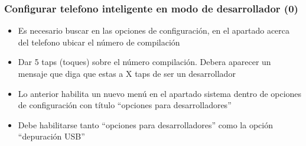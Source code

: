 

\begin{frame}
\frametitle{Configurar telefono inteligente en modo de desarrollador (0)}  
\begin{itemize}
\item Es necesario buscar en las opciones de configuraci\'on, en el apartado acerca del telefono ubicar el n\'umero de compilaci\'on 
\item Dar 5 taps (toques) sobre el n\'umero compilaci\'on. Debera aparecer un mensaje que diga que estas a X taps de ser un desarrollador 
\item Lo anterior habilita un nuevo men\'u en el apartado sistema dentro de opciones de configuraci\'on con t\'itulo ``opciones para desarrolladores'' 
\item Debe habilitarse tanto ``opciones para desarrolladores'' como la opci\'on ``depuraci\'on USB''
\end{itemize}

\end{frame}



